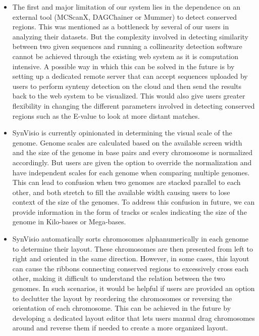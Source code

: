  \begin{itemize}
    \item The first and major limitation of our system lies in the dependence on an external tool (MCScanX, DAGChainer or Mummer) to detect conserved regions. This was mentioned as a bottleneck by several of our users in analyzing their datasets. But the complexity involved in detecting similarity between two given sequences and running a collinearity detection software cannot be achieved through the existing web system as it is computation intensive. A possible way in which this can be solved in the future is by setting up a dedicated remote server that can accept sequences uploaded by users to perform synteny detection on the cloud and then send the results back to the web system to be visualized. This would also give users greater flexibility in changing the different parameters involved in detecting conserved regions such as the E-value  to look at more distant matches.    
    
    \item SynVisio is currently opinionated in determining the visual scale of the genome. Genome scales are calculated based on the available screen width and the size of the genome in base pairs and every chromosome is normalized accordingly. But users are given the option to override the normalization and have independent scales for each genome when comparing multiple genomes. This can lead to confusion when two genomes are stacked parallel to each other, and both stretch to fill the available width causing users to lose context of the size of the genomes. To address this confusion in future, we can provide information in the form of tracks or scales indicating the size of the genome in Kilo-bases or Mega-bases.
    
    \item SynVisio automatically sorts chromosomes alphanumerically in each genome to determine their layout. These chromosomes are then presented from left to right and oriented in the same direction. However, in some cases, this layout can cause the ribbons connecting conserved regions to excessively cross each other, making it difficult to understand the relation between the two genomes. In such scenarios, it would be helpful if users are provided an option to declutter the layout by reordering the chromosomes or reversing the orientation of each chromosome. This can be achieved in the future by developing a dedicated layout editor that lets users manual drag chromosomes around and reverse them if needed to create a more organized layout.
    

\end{itemize}
